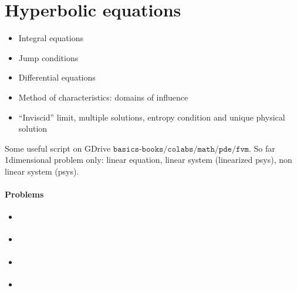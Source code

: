 \documentclass[letterpaper,10pt,english]{jupyterBook}
\begin{document}
\sphinxstepscope


\chapter{Hyperbolic equations}
\label{\detokenize{ch/pde/hyperbolic:hyperbolic-equations}}\label{\detokenize{ch/pde/hyperbolic:pde-hyperbolic}}\label{\detokenize{ch/pde/hyperbolic::doc}}\begin{itemize}
\item {} 
\sphinxAtStartPar
Integral equations

\item {} 
\sphinxAtStartPar
Jump conditions

\item {} 
\sphinxAtStartPar
Differential equations

\item {} 
\sphinxAtStartPar
Method of characteristics: domains of influence

\item {} 
\sphinxAtStartPar
“Inviscid” limit, multiple solutions, entropy condition and unique physical solution

\end{itemize}

\sphinxAtStartPar
Some useful script on GDrive \(\texttt{basics-books/colabs/math/pde/fvm}\). So far 1\sphinxhyphen{}dimensional problem only: linear equation, linear system (linearized p\sphinxhyphen{}sys), non linear system (p\sphinxhyphen{}sys).


\subsubsection*{Problems}

\sphinxAtStartPar
{}
\begin{itemize}
\item {} 
\sphinxAtStartPar
{\hyperref[\detokenize{ch/pde/hyperbolic-1d-scalar-linear:pde-hyperbolic-problems-1d-scalar-linear}]{}}

\item {} 
\sphinxAtStartPar
{\hyperref[\detokenize{ch/pde/hyperbolic-1d-vector-linear:pde-hyperbolic-problems-1d-vector-linear}]{}}

\item {} 
\sphinxAtStartPar
{\hyperref[\detokenize{ch/pde/hyperbolic-1d-scalar-nonlinear:pde-hyperbolic-problems-1d-scalar-nonlinear}]{}}

\item {} 
\sphinxAtStartPar
{}

\end{itemize}
\end{document}
